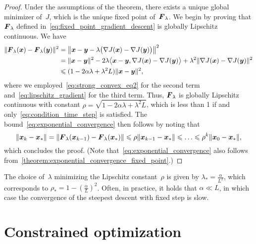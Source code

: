 \begin{proof}
    Under the assumptions of the theorem,
    there exists a unique global minimizer of~$J$,
    which is the unique fixed point of~$\vect F_{\lambda}$.
    We begin by proving that $\vect F_{\lambda}$ defined in~\eqref{eq:fixed_point_gradient_descent} is globally Lipschitz continuous.
    We have
    \begin{align*}
        \norm{ \vect F_{\lambda}(\vect x) - \vect F_{\lambda}(\vect y) }^2
        &= \norm*{ \vect x - \vect y - \lambda \bigl(\nabla J(\vect x) - \nabla J(\vect y) \bigr) }^2 \\
        &= \norm{\vect x - \vect y}^2 - 2 \lambda \ip[\big]{\vect x - \vect y, \nabla J(\vect x) - \nabla J(\vect y)} + \lambda^2 \norm{\nabla J(\vect x) - \nabla J(\vect y)}^2 \\
        &\leq (1 - 2 \alpha \lambda + \lambda^2 L) \norm{\vect x - \vect y}^2,
    \end{align*}
    where we employed~\eqref{eq:strong_convex_eq2} for the second term and~\eqref{eq:lipschitz_gradient} for the third term.
    Thus, $\vect F_{\lambda}$ is globally Lipschitz continuous with constant $\rho = \sqrt{1 - 2 \alpha \lambda + \lambda^2 L}$,
    which is less than 1 if and only~\eqref{eq:condition_time_step} is satisfied.
    The bound~\eqref{eq:exponential_convergence} then follows by noting that
    \[
        \norm{\vect x_k - \vect x_*} = \norm{\vect F_{\lambda}(\vect x_{k-1}) - \vect F_{\lambda} (\vect x_*)}
        \leq \rho \norm{\vect x_{k-1} - \vect x_*} \leq \dots \leq \rho^k \norm{\vect x_0 - \vect x_*},
    \]
    which concludes the proof.
    (Note that~\eqref{eq:exponential_convergence} also follows from~\cref{theorem:exponential_convergence_fixed_point}.)
\end{proof}

\begin{remark}
    The choice of~$\lambda$ minimizing the Lipschitz constant~$\rho$ is given by $\lambda_* = \frac{\alpha}{L^2}$,
    which corresponds to $\rho_* = 1 - \left(\frac{\alpha}{L}\right)^2$.
    Often, in practice, it holds that $\alpha \ll L$,
    in which case the convergence of the steepest descent with fixed step is slow.
\end{remark}

\section{Constrained optimization}
\label{sec:constrained_optimization}

